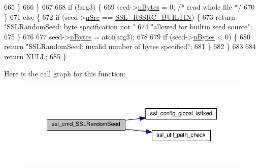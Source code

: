 \begin{DoxyCode}
665         \}
666     \}
667 
668     \textcolor{keywordflow}{if} (!arg3) \{
669         seed->\hyperlink{structssl__randseed__t_adf0224c594bfffd1556f8e970d51fbb9}{nBytes} = 0; \textcolor{comment}{/* read whole file */}
670     \}
671     \textcolor{keywordflow}{else} \{
672         \textcolor{keywordflow}{if} (seed->\hyperlink{structssl__randseed__t_af1d3a2bb8da081095e00edb1a2362e75}{nSrc} == \hyperlink{group__MOD__SSL__PRIVATE_gga950679a8e8bb92658a71bcfdb304390fa8c20f943ba387041091dbae648b1d3d6}{SSL\_RSSRC\_BUILTIN}) \{
673             \textcolor{keywordflow}{return} \textcolor{stringliteral}{"SSLRandomSeed: byte specification not "}
674                    \textcolor{stringliteral}{"allowed for builtin seed source"};
675         \}
676 
677         seed->\hyperlink{structssl__randseed__t_adf0224c594bfffd1556f8e970d51fbb9}{nBytes} = atoi(arg3);
678 
679         \textcolor{keywordflow}{if} (seed->\hyperlink{structssl__randseed__t_adf0224c594bfffd1556f8e970d51fbb9}{nBytes} < 0) \{
680             \textcolor{keywordflow}{return} \textcolor{stringliteral}{"SSLRandomSeed: invalid number of bytes specified"};
681         \}
682     \}
683 
684     \textcolor{keywordflow}{return} \hyperlink{pcre_8txt_ad7f989d16aa8ca809a36bc392c07fba1}{NULL};
685 \}
\end{DoxyCode}


Here is the call graph for this function\+:
\nopagebreak
\begin{figure}[H]
\begin{center}
\leavevmode
\includegraphics[width=350pt]{group__MOD__SSL__PRIVATE_ga9a004e9d6ce2fb8f1c7d0db9dd6793ab_cgraph}
\end{center}
\end{figure}


